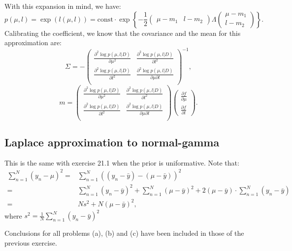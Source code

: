 \documentclass[UTF8]{ctexart}
\begin{document}
With this expansion in mind, we have:
$$p(\mu,l)=\exp(l(\mu,l))=\text{const}\cdot \exp\left\{-\frac{1}{2}\begin{pmatrix}
\mu-m_{1} & l-m_{2}
\end{pmatrix}
\Lambda
\begin{pmatrix}
\mu-m_{1} \\
l-m_{2}
\end{pmatrix} \right\}.$$
Calibrating the coefficient, we know that the covariance and the mean for this approximation are:
$$\Sigma=- \begin{pmatrix} \frac{\partial^{2} \log p(\mu,l|D)}{\partial \mu^{2}} & \frac{\partial^{2} \log p(\mu,l|D)}{\partial l^{2}} \\ \frac{\partial^{2} \log p(\mu,l|D)}{\partial l^{2}} &  \frac{\partial^{2} \log p(\mu,l|D)}{\partial \mu \partial l} \\ \end{pmatrix}^{-1},$$
$$m= \begin{pmatrix} \frac{\partial^{2} \log p(\mu,l|D)}{\partial \mu^{2}} & \frac{\partial^{2} \log p(\mu,l|D)}{\partial l^{2}} \\ \frac{\partial^{2} \log p(\mu,l|D)}{\partial l^{2}} &  \frac{\partial^{2} \log p(\mu,l|D)}{\partial \mu \partial l} \\ \end{pmatrix}
\begin{pmatrix}
\frac{\partial f}{\partial \mu} \\ \frac{\partial f}{\partial l}
\end{pmatrix}.
$$

\subsection{Laplace approximation to normal-gamma}
This is the same with exercise 21.1 when the prior is uniformative. 
Note that:
\begin{align}
\sum_{n=1}^{N}(y_{n}-\mu)^{2}=& \sum_{n=1}^{N}((y_{n}-\bar{y})-(\mu-\bar{y}))^{2} \nonumber \\
=&\sum_{n=1}^{N}(y_{n}-\bar{y})^{2} + \sum_{n=1}^{N}(\mu-\bar{y})^{2} + 2(\mu-\bar{y})\cdot\sum_{n=1}^{N}(y_{n}-\bar{y})\nonumber \\
=&Ns^{2}+N(\mu-\bar{y})^{2}, \nonumber
\end{align}
where $s^{2}=\frac{1}{N}\sum_{n=1}^{N}(y_{n}-\bar{y})^{2}$

Conclusions for all problems (a), (b) and (c) have been included in those of the previous exercise.
\end{document}
